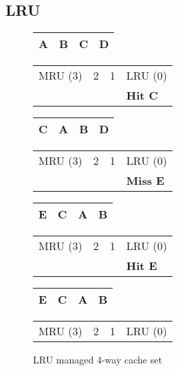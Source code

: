 
\subsection{LRU}
\label{sec:background:algorithms:lru}


\begin{figure}[ht]
    \centering
    \begin{tabular}{|p{2cm}|p{2cm}|p{2cm}|p{2cm}|}
        \hline
        A & B & C & D \\
        \hline
    \end{tabular}
    \begin{tabular}{p{2cm}p{2cm}p{2cm}p{2cm}}
        MRU (3) & 2 & 1 & LRU (0) \\
            &  &  & \bf{Hit C}
    \end{tabular}    

    \begin{tabular}{|p{2cm}|p{2cm}|p{2cm}|p{2cm}|}
        \hline
        C & A & B & D \\
        \hline
    \end{tabular}
    \begin{tabular}{p{2cm}p{2cm}p{2cm}p{2cm}}
        MRU (3) & 2 & 1 & LRU (0) \\
            &  &  & \bf{Miss E}
    \end{tabular}    

    \begin{tabular}{|p{2cm}|p{2cm}|p{2cm}|p{2cm}|}
        \hline
        E & C & A & B \\
        \hline
    \end{tabular}
    \begin{tabular}{p{2cm}p{2cm}p{2cm}p{2cm}}
        MRU (3) & 2 & 1 & LRU (0) \\
            &  &  & \bf{Hit E}
    \end{tabular}    

    \begin{tabular}{|p{2cm}|p{2cm}|p{2cm}|p{2cm}|}
        \hline
        E & C & A & B \\
        \hline
    \end{tabular}
    \begin{tabular}{p{2cm}p{2cm}p{2cm}p{2cm}}
        MRU (3) & 2 & 1 & LRU (0) \\
    \end{tabular}    

    \caption{LRU managed 4-way cache set}
    \label{fig:background:lru_example}
\end{figure}


